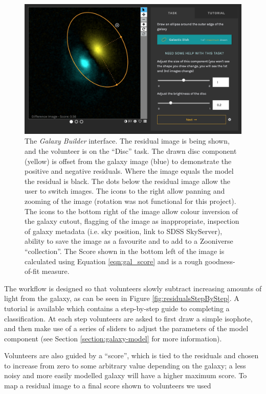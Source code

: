 \documentclass[../main.tex]{subfiles}
\begin{document}
\begin{figure}
  \includegraphics[width=17.7cm]{images__method/interface_in_progress.jpg}
  \caption{The \textit{Galaxy Builder} interface. The residual image is being shown, and the volunteer is on the ``Disc'' task. The drawn disc component (yellow) is offset from the galaxy image (blue) to demonstrate the positive and negative residuals. Where the image equals the model the residual is black. The dots below the residual image allow the user to switch images. The icons to the right allow panning and zooming of the image (rotation was not functional for this project). The icons to the bottom right of the image allow colour inversion of the galaxy cutout, flagging of the image as inappropriate, inspection of galaxy metadata (i.e. sky position, link to SDSS SkyServer), ability to save the image as a favourite and to add to a Zooniverse ``collection''. The Score shown in the bottom left of the image is calculated using Equation \ref{eqn:gal_score} and is a rough goodness-of-fit measure.}
  \label{fig:interfaceInProgress}
\end{figure}


The workflow is designed so that volunteers slowly subtract increasing amounts of light from the galaxy, as can be seen in Figure \ref{fig:residualsStepByStep}. A tutorial is available which contains a step-by-step guide to completing a classification. At each step volunteers are asked to first draw a simple isophote, and then make use of a series of sliders to adjust the parameters of the model component (see Section \ref{section:galaxy-model} for more information).

Volunteers are also guided by a ``score'', which is tied to the residuals and chosen to increase from zero to some arbitrary value depending on the galaxy; a less noisy and more easily modelled galaxy will have a higher maximum score. To map a residual image to a final score shown to volunteers we used
\end{document}
